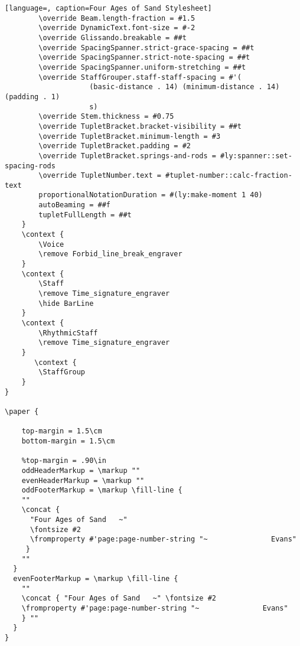 \begin{lstlisting}[language=, caption=Four Ages of Sand Stylesheet]
        \override Beam.length-fraction = #1.5
        \override DynamicText.font-size = #-2
		\override Glissando.breakable = ##t
        \override SpacingSpanner.strict-grace-spacing = ##t
        \override SpacingSpanner.strict-note-spacing = ##t
        \override SpacingSpanner.uniform-stretching = ##t
        \override StaffGrouper.staff-staff-spacing = #'(
					(basic-distance . 14) (minimum-distance . 14) (padding . 1)
					s)
		\override Stem.thickness = #0.75
        \override TupletBracket.bracket-visibility = ##t
        \override TupletBracket.minimum-length = #3
        \override TupletBracket.padding = #2
        \override TupletBracket.springs-and-rods = #ly:spanner::set-spacing-rods
        \override TupletNumber.text = #tuplet-number::calc-fraction-text
		proportionalNotationDuration = #(ly:make-moment 1 40)
        autoBeaming = ##f
        tupletFullLength = ##t
    }
	\context {
        \Voice
        \remove Forbid_line_break_engraver
    }
    \context {
        \Staff
        \remove Time_signature_engraver
		\hide BarLine
    }
    \context {
        \RhythmicStaff
        \remove Time_signature_engraver
    }
       \context {
        \StaffGroup
    }
}

\paper {

	top-margin = 1.5\cm
	bottom-margin = 1.5\cm

	%top-margin = .90\in
	oddHeaderMarkup = \markup ""
	evenHeaderMarkup = \markup ""
	oddFooterMarkup = \markup \fill-line {
    ""
    \concat {
      "Four Ages of Sand   ~"
	  \fontsize #2
	  \fromproperty #'page:page-number-string "~               Evans"
     }
    ""
  }
  evenFooterMarkup = \markup \fill-line {
    ""
	\concat { "Four Ages of Sand   ~" \fontsize #2
	\fromproperty #'page:page-number-string "~               Evans"
    } ""
  }
}
\end{lstlisting}